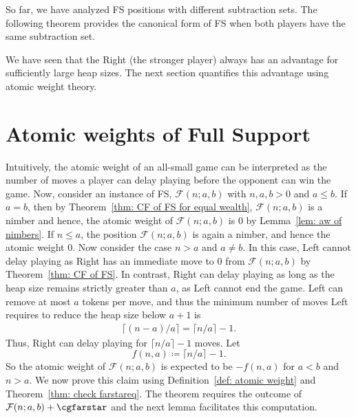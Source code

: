 \documentclass[oneside,reqno]{amsart}
\newcommand{\fs}{\mathcal{F}}
\begin{document}
So far, we have analyzed {\sc FS} positions with different subtraction sets. The following theorem provides the canonical form of {\sc FS} when both players have the same subtraction set.

We have seen that the Right (the stronger player) always has an advantage for sufficiently large heap sizes. The next section quantifies this advantage using atomic weight theory.










\section{Atomic weights of Full Support}\label{sec: AW of FS}


Intuitively, the atomic weight of an all-small game can be interpreted as the number of moves a player can delay playing before the opponent can win the game. Now, consider an instance of {\sc FS}, $\fs(n;a,b)$ with $n,a,b>0$ and $a\le b$. If $a=b$, then by Theorem~\ref{thm: CF of FS for equal wealth}, $\fs(n;a,b)$ is a nimber and hence, the atomic weight of $\fs(n;a,b)$ is 0 by Lemma~\ref{lem: aw of nimbers}. If $n\leq a$, the position $\fs(n;a,b)$ is again a nimber, and hence the atomic weight $0$. Now consider the case $n>a$ and $a\ne b$. In this case, Left cannot delay playing as Right has an immediate move to $0$ from $\fs(n;a,b)$ by Theorem~\ref{thm: CF of FS}. In contrast, Right can delay playing as long as the heap size remains strictly greater than $a$, as Left cannot end the game. Left can remove at most $a$ tokens per move, and thus the minimum number of moves Left requires to reduce the heap size below $a+1$ is \begin{align}
    \lceil (n-a)/a\rceil=\lceil n/a\rceil-1.\label{eq: FS Left required moves}
\end{align}
Thus, Right can delay playing for $\lceil n/a\rceil -1$ moves. Let $$f(n,a)\coloneq\lceil n/a\rceil-1.$$ 
So the atomic weight of $\fs(n;a,b)$ is expected to be $-f(n,a)$ for $a<b$ and $n>a$. We now prove this claim using Definition~\ref{def: atomic weight} and Theorem~\ref{thm: check farstareq}. The theorem requires the outcome of $\fs(n;a,b)+\cgfarstar$ and the next lemma facilitates this computation.
\end{document}
